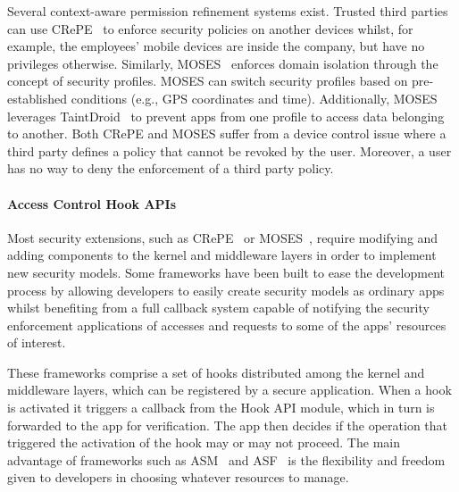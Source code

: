 Several context-aware permission refinement systems exist. Trusted third parties can use CRePE~\cite{conti2011crepe} to enforce security policies on another devices whilst, for example, the employees' mobile devices are inside the company, but have no privileges otherwise. %
Similarly, MOSES~\cite{russello2012moses} enforces domain isolation through the concept of security profiles. MOSES can switch security profiles based on pre-established conditions (e.g., GPS coordinates and time).
Additionally, MOSES leverages TaintDroid~\cite{enck2014taintdroid} to prevent apps from one profile to access data belonging to another. Both CRePE and MOSES suffer from a device control issue where a third party defines a policy that cannot be revoked by the user. Moreover, a user has no way to deny the enforcement of a third party policy. 

\paragraph{\textbf{Access Control Hook APIs}}

Most security extensions, such as CRePE~\cite{conti2011crepe} or MOSES~\cite{russello2012moses}, require modifying and adding components to the kernel and middleware layers in order to implement new security models. Some frameworks have been built to ease the development process by allowing developers to easily create security models as ordinary apps whilst benefiting from a full callback system capable of notifying the security enforcement applications of accesses and requests to some of the apps' resources of interest.

These frameworks comprise a set of hooks distributed among the kernel and middleware layers, which can be registered by a secure application. When a hook is activated it triggers a callback from the Hook API module, which in turn is forwarded to the app for verification. The app then decides if the operation that triggered the activation of the hook may or may not proceed. The main advantage of frameworks such as \ac{ASM}~\cite{heuser2014asm} and \ac{ASF}~\cite{backes2014android} is the flexibility and freedom given to developers in choosing whatever resources to manage.

